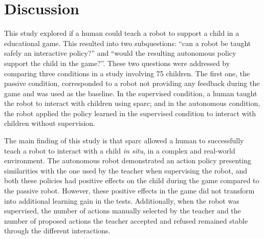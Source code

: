 %
%


\section{Discussion} \label{sec:tutoring_discussion}

This study explored if a human could teach a robot to support a child in a educational game. This resulted into two subquestions: ``can a robot be taught safely an interactive policy?'' and ``would the resulting autonomous policy support the child in the game?''. These two questions were addressed by comparing three conditions in a study involving 75 children. The first one, the passive condition, corresponded to a robot not providing any feedback during the game and was used as the baseline. In the supervised condition, a human taught the robot to interact with children using \gls{sparc}; and in the autonomous condition, the robot applied the policy learned in the supervised condition to interact with children without supervision.

The main finding of this study is that \gls{sparc} allowed a human to successfully teach a robot to interact with a child \textit{in situ}, in a complex and real-world environment. The autonomous robot demonstrated an action policy presenting similarities with the one used by the teacher when supervising the robot, and both these policies had positive effects on the child during the game compared to the passive robot. However, these positive effects in the game did not transform into additional learning gain in the tests. Additionally, when the robot was supervised, the number of actions manually selected by the teacher and the number of proposed actions the teacher accepted and refused remained stable through the different interactions.

